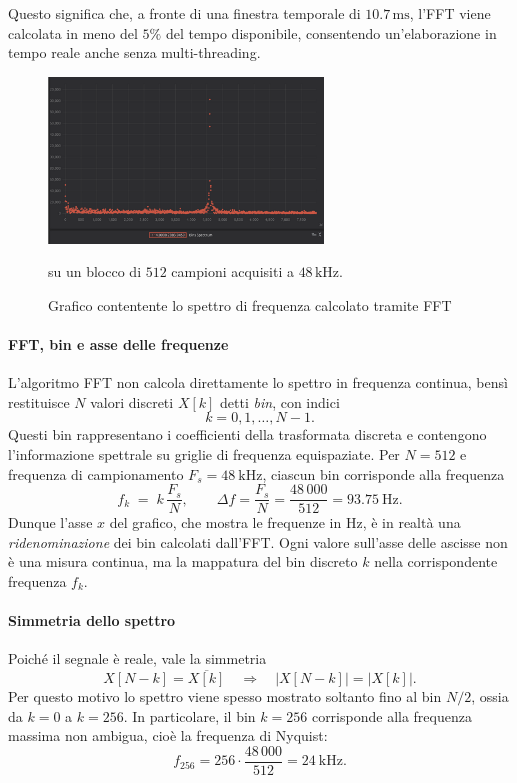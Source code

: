 \noindent
Questo significa che, a fronte di una finestra temporale di $10.7\,\text{ms}$, l’FFT viene calcolata in meno del $5\%$ del tempo disponibile, consentendo un’elaborazione in tempo reale anche senza multi-threading.

\begin{figure}[H]
    \centering
    \includegraphics[width=0.65\textwidth]{immagini/fft_spectrum.png}
    \caption{Grafico contentente lo spettro di frequenza calcolato tramite FFT} su un blocco di $512$ campioni acquisiti a $48\,\text{kHz}$.
    \label{fig:spettro}
\end{figure}

\paragraph{FFT, bin e asse delle frequenze}
L'algoritmo FFT non calcola direttamente lo spettro in frequenza continua, bensì restituisce $N$ valori discreti $X[k]$ detti \emph{bin}, con indici
\[
k=0,1,\dots,N-1.
\]
Questi bin rappresentano i coefficienti della trasformata discreta e contengono l’informazione spettrale su griglie di frequenza equispaziate. 
Per $N=512$ e frequenza di campionamento $F_s=48~\mathrm{kHz}$, ciascun bin corrisponde alla frequenza
\[
f_k \;=\; k\,\frac{F_s}{N},
\qquad \Delta f = \frac{F_s}{N} = \frac{48\,000}{512} = 93.75~\mathrm{Hz}.
\]
Dunque l’asse $x$ del grafico, che mostra le frequenze in Hz, è in realtà una \emph{ridenominazione} dei bin calcolati dall’FFT. 
Ogni valore sull’asse delle ascisse non è una misura continua, ma la mappatura del bin discreto $k$ nella corrispondente frequenza $f_k$.

\paragraph{Simmetria dello spettro}
Poiché il segnale è reale, vale la simmetria
\[
X[N-k] = \overline{X[k]} \quad \Rightarrow \quad |X[N-k]|=|X[k]|.
\]
Per questo motivo lo spettro viene spesso mostrato soltanto fino al bin $N/2$, ossia da $k=0$ a $k=256$. 
In particolare, il bin $k=256$ corrisponde alla frequenza massima non ambigua, cioè la frequenza di Nyquist:
\[
f_{256} = 256 \cdot \frac{48\,000}{512} = 24~\mathrm{kHz}.
\]

